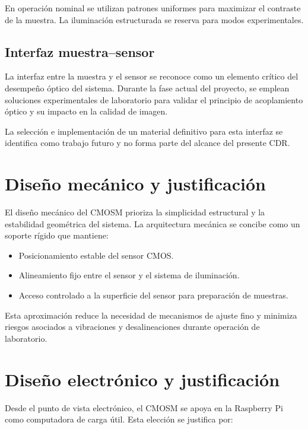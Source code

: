 En operación nominal se utilizan patrones uniformes para maximizar el contraste
de la muestra. La iluminación estructurada se reserva para modos experimentales.

\subsection{Interfaz muestra--sensor}

La interfaz entre la muestra y el sensor se reconoce como un elemento crítico
del desempeño óptico del sistema. Durante la fase actual del proyecto, se
emplean soluciones experimentales de laboratorio para validar el principio de
acoplamiento óptico y su impacto en la calidad de imagen.

La selección e implementación de un material definitivo para esta interfaz se
identifica como trabajo futuro y no forma parte del alcance del presente CDR.

\section{Diseño mecánico y justificación}

El diseño mecánico del CMOSM prioriza la simplicidad estructural y la estabilidad
geométrica del sistema. La arquitectura mecánica se concibe como un soporte
rígido que mantiene:

\begin{itemize}
    \item Posicionamiento estable del sensor CMOS.
    \item Alineamiento fijo entre el sensor y el sistema de iluminación.
    \item Acceso controlado a la superficie del sensor para preparación de
    muestras.
\end{itemize}

Esta aproximación reduce la necesidad de mecanismos de ajuste fino y minimiza
riesgos asociados a vibraciones y desalineaciones durante operación de
laboratorio.

\section{Diseño electrónico y justificación}

Desde el punto de vista electrónico, el CMOSM se apoya en la Raspberry Pi como
computadora de carga útil. Esta elección se justifica por:

